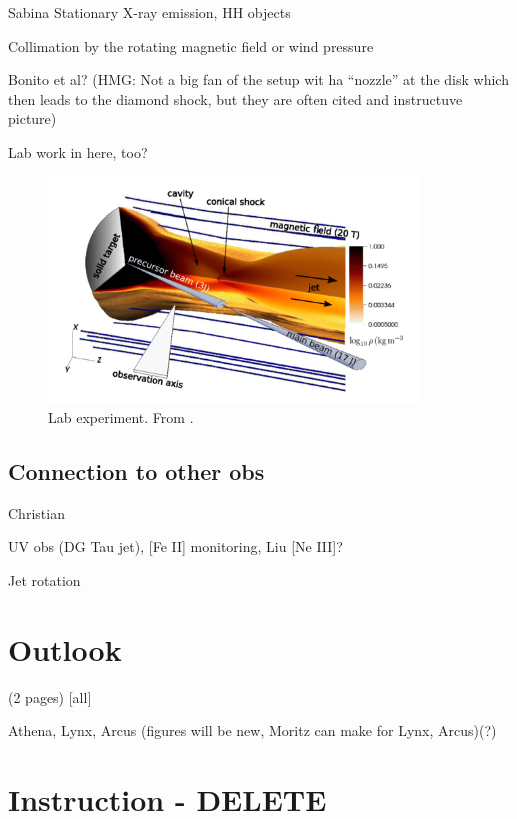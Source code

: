 \documentclass[graybox, nosecnum]{svmult}
\begin{document}
{\color{blue}Sabina
Stationary X-ray emission, HH objects

Collimation by the rotating magnetic field or wind pressure

Bonito et al? (HMG: Not a big fan of the setup wit ha ``nozzle'' at the disk which then leads to the diamond shock, but they are often cited and instructuve picture)

Lab work in here, too?
}


\begin{figure}[t]
\centering

\includegraphics[height=6cm]{figs/lab}
\caption{Lab experiment. From \citet{PhysRevLett.119.255002}. \label{fig:lab}}
\end{figure}


\subsection{Connection to other obs}
{\color{blue}Christian

UV obs (DG Tau jet), [Fe II] monitoring, Liu [Ne III]?

Jet rotation
}
\section{Outlook}
{\color{blue}(2 pages) [all]

Athena, Lynx, Arcus (figures will be new, Moritz can make for Lynx, Arcus)(?)
}


\section{Instruction - DELETE}

\vspace{0.3cm}
\end{document}
